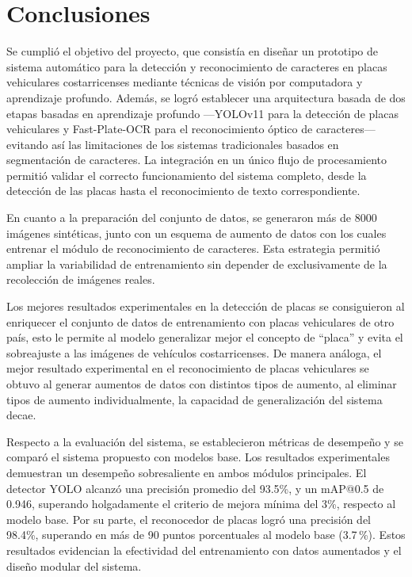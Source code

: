 \chapter{Conclusiones}
\label{ch:conclusiones}

Se cumplió el objetivo del proyecto,
que consistía en diseñar un prototipo de sistema automático para la detección y
reconocimiento de caracteres en placas vehiculares costarricenses 
mediante técnicas de visión por computadora y aprendizaje profundo.
Además, se logró establecer una arquitectura basada de dos etapas basadas en aprendizaje profundo
---YOLOv11 para la detección de placas vehiculares y Fast-Plate-OCR para el reconocimiento óptico de caracteres---
evitando así las limitaciones de los sistemas tradicionales basados en segmentación de caracteres. 
La integración en un único flujo de procesamiento permitió validar el correcto funcionamiento del sistema completo,
desde la detección de las placas hasta el reconocimiento de texto correspondiente.

En cuanto a la preparación del conjunto de datos,
se generaron más de 8000 imágenes sintéticas,
junto con un esquema de aumento de datos con los cuales entrenar el 
módulo de reconocimiento de caracteres. 
Esta estrategia permitió ampliar la variabilidad de entrenamiento sin depender de
exclusivamente de la recolección de imágenes reales.

Los mejores resultados experimentales en la detección de placas se consiguieron 
al enriquecer el conjunto de datos de entrenamiento con placas vehiculares de otro país,
esto le permite al modelo generalizar mejor el concepto de ``placa'' y evita el 
sobreajuste a las imágenes de vehículos costarricenses.
De manera análoga, el mejor resultado experimental en el reconocimiento de placas
vehiculares se obtuvo al generar aumentos de datos con distintos tipos de aumento,
al eliminar tipos de aumento individualmente, la capacidad de generalización
del sistema decae.

Respecto a la evaluación del sistema,
se establecieron métricas de desempeño y se comparó el sistema propuesto con modelos base.
Los resultados experimentales demuestran un desempeño sobresaliente en ambos módulos principales. 
El detector YOLO alcanzó una precisión promedio del 93.5\%, y un mAP@0.5 de 0.946,
superando holgadamente el criterio de mejora mínima del 3\%, respecto al modelo base. 
Por su parte, el reconocedor de placas logró una precisión del 98.4\%,
superando en más de 90 puntos porcentuales al modelo base (3.7\,\%). 
Estos resultados evidencian la efectividad del entrenamiento con datos aumentados y el diseño modular del sistema.

